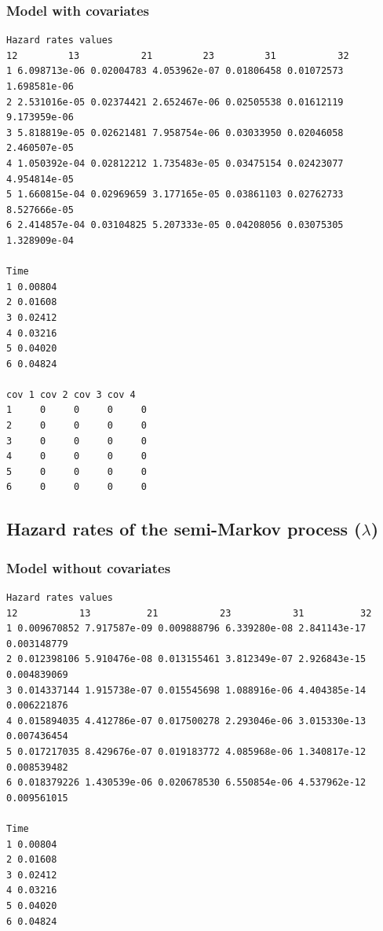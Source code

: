 \documentclass[11pt]{article}
\begin{document}
\subsubsection{Model with covariates}

\begin{verbatim}
Hazard rates values 
12         13           21         23         31           32
1 6.098713e-06 0.02004783 4.053962e-07 0.01806458 0.01072573 1.698581e-06
2 2.531016e-05 0.02374421 2.652467e-06 0.02505538 0.01612119 9.173959e-06
3 5.818819e-05 0.02621481 7.958754e-06 0.03033950 0.02046058 2.460507e-05
4 1.050392e-04 0.02812212 1.735483e-05 0.03475154 0.02423077 4.954814e-05
5 1.660815e-04 0.02969659 3.177165e-05 0.03861103 0.02762733 8.527666e-05
6 2.414857e-04 0.03104825 5.207333e-05 0.04208056 0.03075305 1.328909e-04

Time
1 0.00804
2 0.01608
3 0.02412
4 0.03216
5 0.04020
6 0.04824

cov 1 cov 2 cov 3 cov 4
1     0     0     0     0
2     0     0     0     0
3     0     0     0     0
4     0     0     0     0
5     0     0     0     0
6     0     0     0     0
\end{verbatim}



\subsection{Hazard rates of the semi-Markov process ($\lambda$)}

\subsubsection{Model without covariates}

\begin{verbatim}
Hazard rates values 
12           13          21           23           31          32
1 0.009670852 7.917587e-09 0.009888796 6.339280e-08 2.841143e-17 0.003148779
2 0.012398106 5.910476e-08 0.013155461 3.812349e-07 2.926843e-15 0.004839069
3 0.014337144 1.915738e-07 0.015545698 1.088916e-06 4.404385e-14 0.006221876
4 0.015894035 4.412786e-07 0.017500278 2.293046e-06 3.015330e-13 0.007436454
5 0.017217035 8.429676e-07 0.019183772 4.085968e-06 1.340817e-12 0.008539482
6 0.018379226 1.430539e-06 0.020678530 6.550854e-06 4.537962e-12 0.009561015

Time
1 0.00804
2 0.01608
3 0.02412
4 0.03216
5 0.04020
6 0.04824
\end{verbatim}
\end{document}

